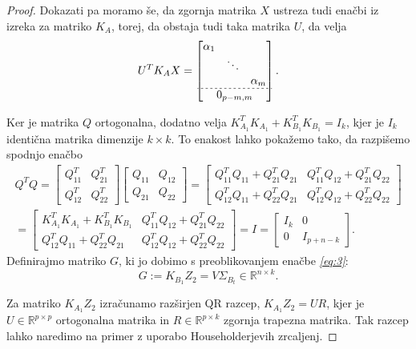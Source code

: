 \documentclass[mat1]{article}
\theoremstyle{definition}
\begin{document}
\begin{proof}
Dokazati pa moramo še, da zgornja matrika $X$ ustreza tudi enačbi iz izreka za matriko $K_A$, torej, da obstaja tudi taka matrika $U$, da velja
\begin{gather*}
 U^T K_A X = 
\begin{bmatrix}
\begin{matrix}
\alpha_1 & & \\
 & \ddots & \\
 & & \alpha_m
\end{matrix} \\ \hdashline[2pt/2pt]
0_{p-m, m}
\end{bmatrix}
\text{.} 
\end{gather*}

Ker je matrika $Q$ ortogonalna, dodatno velja $K_{A_1}^TK_{A_1} + K_{B_1}^TK_{B_1} = I_k$, kjer je $I_k$ identična matrika dimenzije $k \times k$. To enakost lahko pokažemo tako, da razpišemo spodnjo enačbo
\begin{gather*}
Q^T Q = 
\begin{bmatrix}
Q_{11}^T & Q_{21}^T \\ 
Q_{12}^T & Q_{22}^T
\end{bmatrix}
\begin{bmatrix}
Q_{11} & Q_{12} \\ 
Q_{21} & Q_{22}
\end{bmatrix} =
\begin{bmatrix}
Q_{11}^T Q_{11} + Q_{21}^T Q_{21} & Q_{11}^T Q_{12} + Q_{21}^T Q_{22} \\ 
Q_{12}^T Q_{11} + Q_{22}^T Q_{21} & Q_{12}^T Q_{12} + Q_{22}^T Q_{22}
\end{bmatrix} \\ =
\begin{bmatrix}
K_{A_1}^TK_{A_1} + K_{B_1}^TK_{B_1} & Q_{11}^T Q_{12} + Q_{21}^T Q_{22} \\ 
Q_{12}^T Q_{11} + Q_{22}^T Q_{21} & Q_{12}^T Q_{12} + Q_{22}^T Q_{22}
\end{bmatrix}  = I =
\begin{bmatrix}
I_k & 0\\ 
0 & I_{p+n-k}
\end{bmatrix} \text{.}
\end{gather*}
Definirajmo matriko $G$, ki jo dobimo s preoblikovanjem enačbe \textit{\eqref{eq:3}}:
$$ G := K_{B_1} Z_2 = V \Sigma_{B_t} \in \mathbb{R}^{n \times k} \text{.}
$$

Za matriko $K_{A_1} Z_2$ izračunamo razširjen QR razcep, $ K_{A_1} Z_2 = U R$, kjer je $U \in \mathbb{R}^{p \times p}$ ortogonalna matrika in $R \in \mathbb{R}^{p \times k}$ zgornja trapezna matrika. Tak razcep lahko naredimo na primer z uporabo Householderjevih zrcaljenj.


\end{proof}
\end{document}
